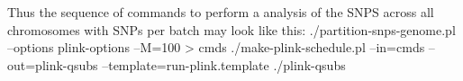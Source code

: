 

\startsubsubject[title={Putting it all together}]

Thus the sequence of commands to perform a \PLINK analysis of the SNPS across all chromosomes
with  SNPs per batch 
may look like this:
\startSTDIN
./partition-snps-genome.pl --options plink-options --M=100 > cmds
./make-plink-schedule.pl --in=cmds --out=plink-qsubs --template=run-plink.template
./plink-qsubs
\stopSTDIN



\startsubsubject[title={To do}]


\stopsubsubject

\endinput



\placefigure[here][fig:partition-flow]
{   Sequence for generating \PLINK scripts
  and a corresponding executable schedule script for 
  SNPs partioned across the genome.
}
{
  \externalfigure[plink-cmd-partition.pdf][width=0.8\textwidth]
}
